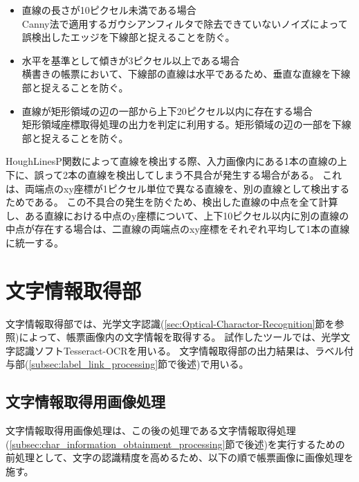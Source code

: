 \begin{itemize}
    \item 直線の長さが10ピクセル未満である場合\\
        Canny法で適用するガウシアンフィルタで除去できていないノイズによって誤検出したエッジを下線部と捉えることを防ぐ。
    \item 水平を基準として傾きが3ピクセル以上である場合\\
        横書きの帳票において、下線部の直線は水平であるため、垂直な直線を下線部と捉えることを防ぐ。
    \item 直線が矩形領域の辺の一部から上下20ピクセル以内に存在する場合\\
        矩形領域座標取得処理の出力を判定に利用する。矩形領域の辺の一部を下線部と捉えることを防ぐ。
\end{itemize}

HoughLinesP関数によって直線を検出する際、入力画像内にある1本の直線の上下に、誤って2本の直線を検出してしまう不具合が発生する場合がある。
これは、両端点のxy座標が1ピクセル単位で異なる直線を、別の直線として検出するためである。
この不具合の発生を防ぐため、検出した直線の中点を全て計算し、ある直線における中点のy座標について、上下10ピクセル以内に別の直線の中点が存在する場合は、二直線の両端点のxy座標をそれぞれ平均して1本の直線に統一する。

\section{文字情報取得部}\label{sec:OCR_part}
文字情報取得部では、光学文字認識(\ref{sec:Optical-Charactor-Recognition}節を参照)によって、帳票画像内の文字情報を取得する。
試作したツールでは、光学文字認識ソフトTesseract-OCR\cite{Tesseract-OCR}を用いる。
文字情報取得部の出力結果は、ラベル付与部(\ref{subsec:label_link_processing}節で後述)で用いる。

\subsection{文字情報取得用画像処理}\label{subsec:image_processing_for_char_recognition}
文字情報取得用画像処理は、この後の処理である文字情報取得処理(\ref{subsec:char_information_obtainment_processing}節で後述)を実行するための前処理として、文字の認識精度を高めるため、以下の順で帳票画像に画像処理を施す。

